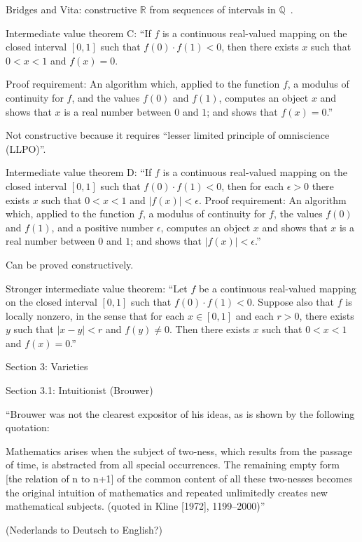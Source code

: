 Bridges and Vita: constructive $\mathbb{R}$ from sequences
of intervals in $\mathbb{Q}$~\cite{bridger2019}.

Intermediate value theorem C: 
``If $f$ is a continuous real-valued mapping 
on the closed interval $[0,1]$ such that $f(0)⋅f(1)<0$, 
then there exists $x$ such that $0<x<1$ and $f(x)=0$.

Proof requirement: 
An algorithm which, applied to the function $f$, 
a modulus of continuity for $f$, and the values $f(0)$ and $f(1)$,
computes an object $x$ and shows that $x$ is a real number 
between $0$ and $1$; and
shows that $f(x)=0$.''~\cite{sep:mathematics_constructive}

Not constructive because it requires
``lesser limited principle of omniscience (LLPO)''.

Intermediate value theorem D:
``If $f$ is a continuous real-valued mapping 
on the closed interval $[0,1]$ 
such that $f(0)⋅f(1)<0$, 
then for each $\epsilon>0$ 
there exists $x$ such that $0<x<1$ and $|f(x)|<\epsilon$.
Proof requirement: 
An algorithm which, applied to the function $f$, 
a modulus of continuity for $f$, the values $f(0)$ and $f(1)$, 
and a positive number $\epsilon$,
computes an object $x$ 
and shows that $x$ is a real number between $0$ and $1$; and
shows that $|f(x)|<\epsilon$.''~\cite{sep:mathematics_constructive}

Can be proved constructively.

Stronger intermediate value theorem:
``Let $f$ be a continuous real-valued mapping 
on the closed interval $[0,1]$ 
such that $f(0)⋅f(1)<0$. 
Suppose also that $f$ is locally nonzero, 
in the sense that for each $x \in [0,1]$
and each $r>0$, 
there exists $y$ such that $|x−y|<r$ and $f(y) \neq 0$. 
Then there exists $x$ such that $0<x<1$ and $f(x)=0$.''

Section 3: Varieties

Section 3.1: Intuitionist (Brouwer)

``Brouwer was not the clearest expositor of his ideas, 
as is shown by the following quotation:

Mathematics arises when the subject of two-ness, 
which results from the passage of time, 
is abstracted from all special occurrences. 
The remaining empty form [the relation of n to n+1] 
of the common content of all these two-nesses 
becomes the original intuition of mathematics 
and repeated unlimitedly creates new mathematical subjects. 
(quoted in Kline [1972], 1199–2000)''

(Nederlands to Deutsch to English?)

